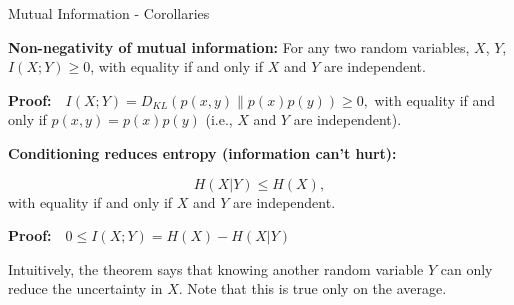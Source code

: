 \begin{vbframe}{Mutual Information - Corollaries}

\small

\textbf{Non-negativity of mutual information:} For any two random variables, $X$, $Y$, $ I(X;Y) \geq 0$, with equality if and only if $X$ and $Y$ are independent. 

\lz

\textbf{Proof:}$\quad I(X ; Y)=D_{KL}(p(x, y) \| p(x) p(y)) \geq 0,$ with equality if and only if $p(x, y)=p(x) p(y)$ (i.e., $X$ and $Y$ are independent).

\lz
  
\textbf{Conditioning reduces entropy (information can't hurt):}

$$H(X | Y) \leq H(X),$$
with equality if and only if $X$ and $Y$ are independent.

\lz

\textbf{Proof:}$\quad 0 \leq I(X ; Y)=H(X)-H(X | Y)$

Intuitively, the theorem says that knowing another random variable $Y$ can only reduce the uncertainty in $X$. Note that this is true only on the average. 

\framebreak









\end{vbframe}
